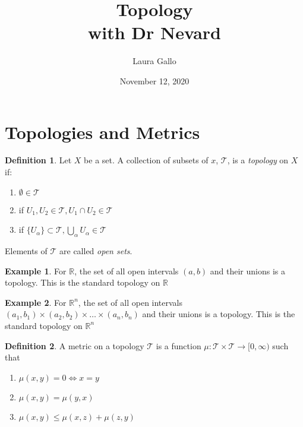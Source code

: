 \documentclass{article}
\title{Topology \\ with Dr Nevard}
\author{Laura Gallo}
\date{November 12, 2020}
\theoremstyle{definition}
\newtheorem{definition}{Definition}
\newtheorem{exampled}{Example}[definition]
\begin{document}
\maketitle

\section{Topologies and Metrics}
\begin{definition}
	Let $X$ be a set. A collection of subsets of $x$, $\mathcal{T}$, is a \emph{topology} on $X$ if:
	\begin{enumerate}
		\item $\emptyset \in \mathcal{T}$
		\item if $U_1, U_2 \in \mathcal{T}, U_1 \cap U_2 \in \mathcal{T}$
		\item if $\{U_\alpha\} \subset \mathcal{T}, \bigcup_\alpha U_\alpha \in \mathcal{T}$
	\end{enumerate}
	\noindent
	Elements of $\mathcal{T}$ are called \emph{open sets}.
\end{definition}

\begin{exampled}
	For $\mathbb{R}$, the set of all open intervals $(a, b)$ and their unions is a topology. This is the standard topology on $\mathbb{R}$
\end{exampled}
\begin{exampled}
	For $\mathbb{R}^n$, the set of all open intervals $(a_1, b_1) \times (a_2, b_2) \times \dots \times (a_n, b_n)$ and their unions is a topology. This is the standard topology on $\mathbb{R}^n$
\end{exampled}

\begin{definition}
	A metric on a topology $\mathcal{T}$ is a function $\mu: \mathcal{T}\times\mathcal{T} \rightarrow [0, \infty)$ such that
	\begin{enumerate}
		\item $\mu(x, y) = 0 \Leftrightarrow x=y$
		\item $\mu(x, y) = \mu(y, x)$
		\item $\mu(x, y) \leq \mu(x, z) + \mu(z, y)$
	\end{enumerate}
\end{definition}
\end{document}
